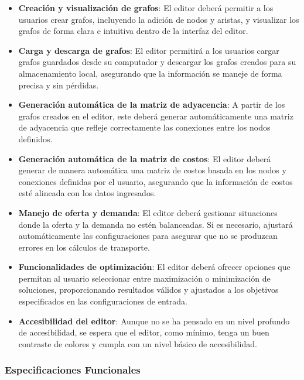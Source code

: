 \documentclass[stu, 12pt, letterpaper, donotrepeattitle, floatsintext, natbib]{apa7}
\begin{document}
\begin{itemize}
    \item \textbf{Creación y visualización de grafos}: 
    El editor deberá permitir a los usuarios crear grafos, incluyendo la adición de nodos y aristas, y visualizar los grafos de forma clara e intuitiva dentro de la interfaz del editor.

    \item \textbf{Carga y descarga de grafos}: 
    El editor permitirá a los usuarios cargar grafos guardados desde su computador y descargar los grafos creados para su almacenamiento local, asegurando que la información se maneje de forma precisa y sin pérdidas.

    \item \textbf{Generación automática de la matriz de adyacencia}: 
    A partir de los grafos creados en el editor, este deberá generar automáticamente una matriz de adyacencia que refleje correctamente las conexiones entre los nodos definidos.

    \item \textbf{Generación automática de la matriz de costos}: 
    El editor deberá generar de manera automática una matriz de costos basada en los nodos y conexiones definidas por el usuario, asegurando que la información de costos esté alineada con los datos ingresados.

    \item \textbf{Manejo de oferta y demanda}: 
    El editor deberá gestionar situaciones donde la oferta y la demanda no estén balanceadas. Si es necesario, ajustará automáticamente las configuraciones para asegurar que no se produzcan errores en los cálculos de transporte.

    \item \textbf{Funcionalidades de optimización}: 
    El editor deberá ofrecer opciones que permitan al usuario seleccionar entre maximización o minimización de soluciones, proporcionando resultados válidos y ajustados a los objetivos especificados en las configuraciones de entrada.

    \item \textbf{Accesibilidad del editor}: 
    Aunque no se ha pensado en un nivel profundo de accesibilidad, se espera que el editor, como mínimo, tenga un buen contraste de colores y cumpla con un nivel básico de accesibilidad.
\end{itemize}


\subsubsection{Especificaciones Funcionales}
\end{document}
